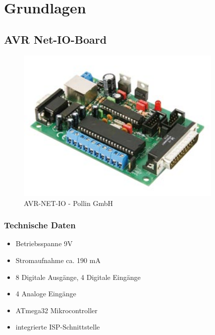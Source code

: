 \chapter{Grundlagen}
\section{AVR Net-IO-Board}
\begin{figure}[h]
\centering
\includegraphics[width=10cm]{content/pictures/avr-net-io.jpg}
\caption{AVR-NET-IO - Pollin GmbH}
\label{fig:B3}
\end{figure}

\subsection{Technische Daten}
\begin{itemize}
  \item Betriebsspanne 9V
  \item Stromaufnahme ca. 190 mA
  \item 8 Digitale Ausgänge, 4 Digitale Eingänge
  \item 4 Analoge Eingänge
  \item ATmega32 Mikrocontroller
  \item integrierte ISP-Schnittstelle
\end{itemize}

